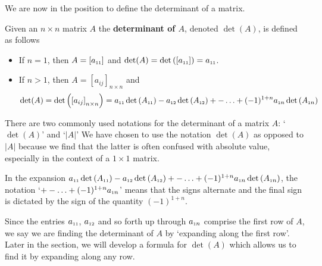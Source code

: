 \documentclass{ximera}
\begin{document}
We are now in the position to define the determinant of a matrix.

\smallskip

\colorbox{ResultColor}{\bbm

\begin{defn} \label{determinantdefn}   Given an $n \times n$ matrix $A$ the \textbf{determinant of \boldmath $A$}, denoted $\det(A)$, is defined as follows

\begin{itemize}

\item  If $n=1$, then $A = \left[ a_{\mbox{\tiny$11$}} \right]$ and $\det(A) = \det\left( \left[ a_{\mbox{\tiny$11$}} \right] \right) = a_{\mbox{\tiny$11$}}$.

\item  If $n>1$, then $A = \left[ a_{ij} \right]_{n \times n}$ and \[ \det(A) = \det\left( \left[ a_{ij} \right]_{n \times n} \right) =  a_{\mbox{\tiny$11$}} \det\left(A_{\mbox{\tiny$11$}}\right)- a_{\mbox{\tiny$12$}} \det\left(A_{\mbox{\tiny$12$}}\right) + -  \ldots  + (-1)^{1+n} a_{\mbox{\tiny$1$}n} \det\left(A_{\mbox{\tiny$1$}n}\right)\]

\end{itemize}

\end{defn}
\ebm}

\smallskip

There are two commonly used notations for the determinant of a matrix $A$: `$\det(A)$' and `$|A|$'
We have chosen to use the notation $\det(A)$ as opposed to $|A|$ because we find that the latter is often confused with absolute value, especially in the context of a $1 \times 1$ matrix.  

In the expansion $a_{\mbox{\tiny$11$}} \det\left(A_{\mbox{\tiny$11$}}\right)- a_{\mbox{\tiny$12$}} \det\left(A_{\mbox{\tiny$12$}}\right) + -  \ldots  + (-1)^{1+n} a_{\mbox{\tiny$1$}n} \det\left(A_{\mbox{\tiny$1$}n}\right)$, the notation `$+ -  \ldots  + (-1)^{1+n} a_{\mbox{\tiny$1$}n}$' means that the signs alternate and the final sign is dictated by the sign of the quantity $(-1)^{1+n}$. 

Since the entries $a_{\mbox{\tiny$11$}}$, $a_{\mbox{\tiny$12$}}$ and so forth up through $a_{\mbox{\tiny$1$}n}$ comprise the first row of $A$, we say we are finding the determinant of $A$  by `expanding along the first row'. Later in the section, we will develop a formula for $\det(A)$ which allows us to find it by expanding along any row.
\end{document}

